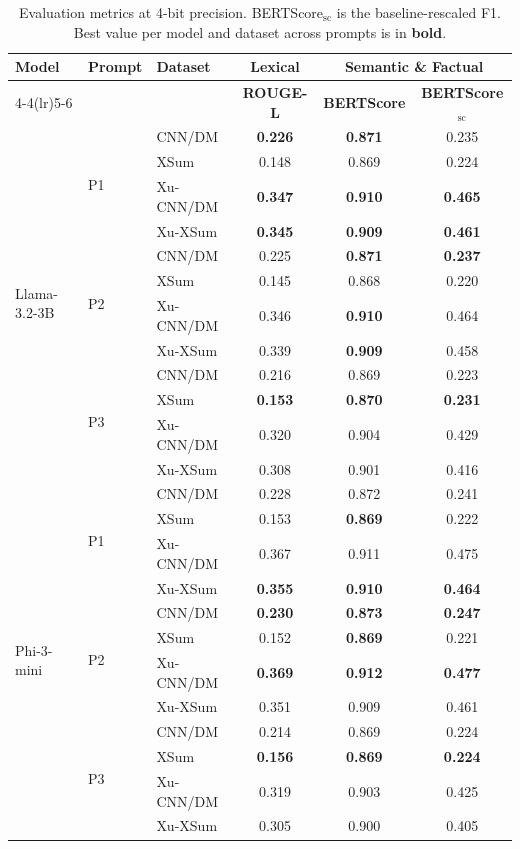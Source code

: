 \begin{table}[H]
\centering
\footnotesize
\setlength{\tabcolsep}{4pt}
\caption{Evaluation metrics at 4-bit precision. BERTScore$_{\mathrm{sc}}$ is the baseline-rescaled F1. Best value per model and dataset across prompts is in \textbf{bold}.}
\label{tab:eval-4bit}
\begin{tabular}{lllccc}
\toprule
\multirow{2}{*}{\textbf{Model}} & \multirow{2}{*}{\textbf{Prompt}} & \multirow{2}{*}{\textbf{Dataset}} & \textbf{Lexical} & \multicolumn{2}{c}{\textbf{Semantic \& Factual}} \\
\cmidrule(lr){4-4}\cmidrule(lr){5-6}
 & & & \textbf{ROUGE-L} & \textbf{BERTScore} & \textbf{BERTScore$_{\mathrm{sc}}$} \\
\midrule
\multirow{12}{*}{Llama-3.2-3B} & \multirow{4}{*}{P1} & CNN/DM & \textbf{0.226} & \textbf{0.871} & 0.235 \\
 &  & XSum & 0.148 & 0.869 & 0.224 \\
 &  & Xu-CNN/DM & \textbf{0.347} & \textbf{0.910} & \textbf{0.465} \\
 &  & Xu-XSum & \textbf{0.345} & \textbf{0.909} & \textbf{0.461} \\
\cmidrule(lr){2-6}
 & \multirow{4}{*}{P2} & CNN/DM & 0.225 & \textbf{0.871} & \textbf{0.237} \\
 &  & XSum & 0.145 & 0.868 & 0.220 \\
 &  & Xu-CNN/DM & 0.346 & \textbf{0.910} & 0.464 \\
 &  & Xu-XSum & 0.339 & \textbf{0.909} & 0.458 \\
\cmidrule(lr){2-6}
 & \multirow{4}{*}{P3} & CNN/DM & 0.216 & 0.869 & 0.223 \\
 &  & XSum & \textbf{0.153} & \textbf{0.870} & \textbf{0.231} \\
 &  & Xu-CNN/DM & 0.320 & 0.904 & 0.429 \\
 &  & Xu-XSum & 0.308 & 0.901 & 0.416 \\
\midrule
\multirow{12}{*}{Phi-3-mini} & \multirow{4}{*}{P1} & CNN/DM & 0.228 & 0.872 & 0.241 \\
 &  & XSum & 0.153 & \textbf{0.869} & 0.222 \\
 &  & Xu-CNN/DM & 0.367 & 0.911 & 0.475 \\
 &  & Xu-XSum & \textbf{0.355} & \textbf{0.910} & \textbf{0.464} \\
\cmidrule(lr){2-6}
 & \multirow{4}{*}{P2} & CNN/DM & \textbf{0.230} & \textbf{0.873} & \textbf{0.247} \\
 &  & XSum & 0.152 & \textbf{0.869} & 0.221 \\
 &  & Xu-CNN/DM & \textbf{0.369} & \textbf{0.912} & \textbf{0.477} \\
 &  & Xu-XSum & 0.351 & 0.909 & 0.461 \\
\cmidrule(lr){2-6}
 & \multirow{4}{*}{P3} & CNN/DM & 0.214 & 0.869 & 0.224 \\
 &  & XSum & \textbf{0.156} & \textbf{0.869} & \textbf{0.224} \\
 &  & Xu-CNN/DM & 0.319 & 0.903 & 0.425 \\
 &  & Xu-XSum & 0.305 & 0.900 & 0.405 \\
\bottomrule
\end{tabular}
\end{table}